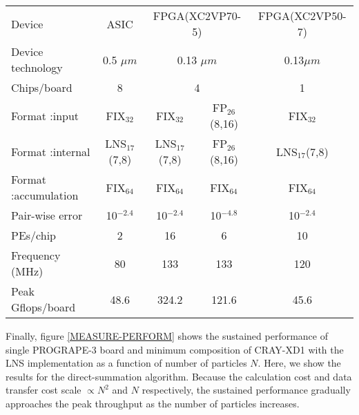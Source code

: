 \documentclass{article}
\begin{document}
{\begin{table*}[t]
\begin{minipage}[b]{1.0\linewidth}
\begin{center}
\begin{tabular}{l|c|c|c|c}
\hline\hline
Device               &   ASIC             & \multicolumn{2}{|c|}{FPGA(XC2VP70-5)}        & FPGA(XC2VP50-7) \\
Device technology      & 0.5 $\mu m$        & \multicolumn{2}{|c|}{ 0.13 $\mu m$}          & 0.13$\mu m$       \\
Chips/board          &   8                & \multicolumn{2}{|c|}{ 4 }                    & 1  \\
Format :input        & FIX$_{32}$         & FIX$_{32}$       & FP$_{26}$(8,16)           & FIX$_{32}$        \\
Format :internal     & LNS$_{17}$(7,8)    & LNS$_{17}$(7,8)  & FP$_{26}$(8,16)           & LNS$_{17}$(7,8)   \\
Format :accumulation & FIX$_{64}$         & FIX$_{64}$       & FIX$_{64}$                & FIX$_{64}$   \\
Pair-wise error             & 10$^{-2.4}$ &  10$^{-2.4}$     & 10$^{-4.8}$               &  10$^{-2.4}$ \\
PEs/chip             & 2                  &  16              &   6                       & 10           \\
Frequency (MHz)      & 80                 & 133              &  133                      & 120          \\
Peak Gflops/board    & 48.6               & 324.2            & 121.6                     & 45.6         \\
\hline
\end{tabular}
\end{center}
\end{minipage}
\end{table*}




Finally, figure \ref{MEASURE-PERFORM} shows the sustained performance of
single PROGRAPE-3 board and minimum composition of CRAY-XD1 with the LNS implementation as a function of
number of particles $N$. Here, we show the results for the
direct-summation algorithm.  Because the calculation cost
and data transfer cost scale $\propto N^2$ and $N$ respectively, the
sustained performance gradually approaches the peak throughput as the
number of particles increases.

}
\end{document}
